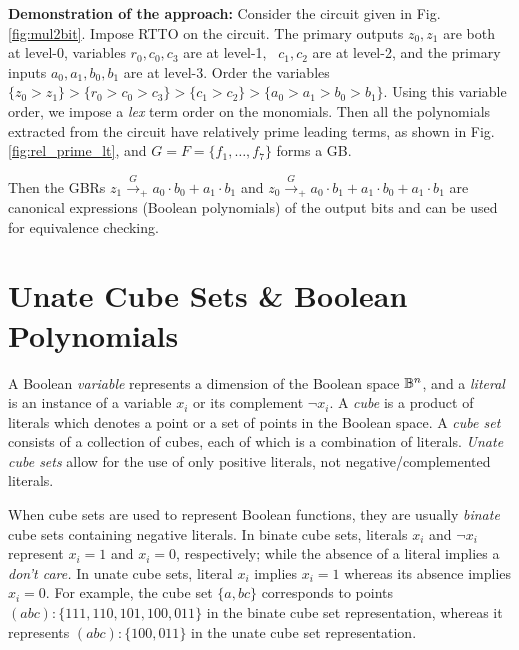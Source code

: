 \begin{Example}
\label{ex1}
{\bf Demonstration of the approach:} Consider the circuit given in
Fig. \ref{fig:mul2bit}. 
Impose RTTO on the circuit. The primary outputs $z_0, z_1$ are both at
level-0, variables $r_0, c_0, c_3$ are at level-1, ~$c_1, c_2$ are at
level-2, and the primary inputs $a_0, a_1, b_0, b_1$ are at
level-3. Order the variables $\{z_0 > z_1\} > \{r_0 > c_0 > c_3\} >
\{c_1 > c_2\} > \{a_0 > a_1 > b_0 > b_1\}$. Using this variable order,
we impose a {\it lex} term order on the monomials. Then all the
polynomials extracted from the circuit have relatively prime leading
terms, as shown in Fig. \ref{fig:rel_prime_lt}, and $G =F = \{f_1, \dots,
f_7\}$ forms a GB. 

Then the GBRs $z_1\xrightarrow{G}_+ a_0\cdot b_0 + a_1\cdot b_1$ and
$z_0\xrightarrow{G}_+a_0\cdot b_1+a_1\cdot b_0 + a_1\cdot b_1$ are
canonical expressions (Boolean polynomials) of the output bits and can
be used for equivalence checking.
\end{Example}





\section{Unate Cube Sets \& Boolean Polynomials}
\label{sec:unate}

A Boolean {\it variable} represents a dimension of the Boolean space
${\mathbb{B}}^n$, and a {\it literal} 
is an instance of a variable $x_i$ or its 
complement $\neg x_i$. A {\it cube} is a product of literals
which denotes a point or a set of points in the Boolean space. A {\it
  cube set} 
consists of a collection of cubes, each of which is a combination of
literals. {\it Unate cube sets} allow for the use of only positive
literals, not negative/complemented literals. 

When cube sets are used to represent Boolean functions, they are
usually {\it binate} cube sets containing negative literals. In binate
cube sets, literals $x_i$ and $\neg x_i$ represent $x_i = 1$ and $x_i = 0$,
respectively; while the absence of a literal implies a {\it don't
  care.} In unate cube sets, literal $x_i$ implies $x_i = 1$ whereas
its absence implies $x_i = 0$. For example, the cube set $\{a,
bc\}$ corresponds to points $(abc): \{111, 110, 101, 100, 011\}$ in
the binate cube set representation, whereas it represents $(abc):
\{100, 011\}$ in the unate cube set representation.

